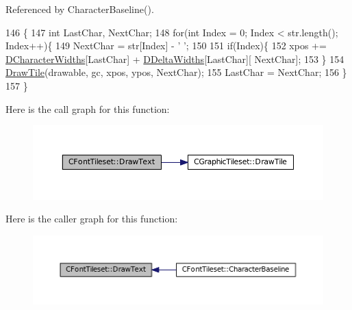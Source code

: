 Referenced by Character\+Baseline().


\begin{DoxyCode}
146                                                                                                        \{
147     \textcolor{keywordtype}{int} LastChar, NextChar;
148     \textcolor{keywordflow}{for}(\textcolor{keywordtype}{int} Index = 0; Index < str.length(); Index++)\{
149         NextChar = str[Index] - \textcolor{charliteral}{' '};
150         
151         \textcolor{keywordflow}{if}(Index)\{
152             xpos += \hyperlink{classCFontTileset_ad25347b5350a8380be8c550d9f2e2798}{DCharacterWidths}[LastChar] + \hyperlink{classCFontTileset_a1e253853e14282e9582a7f47dace8f70}{DDeltaWidths}[LastChar][
      NextChar]; 
153         \}
154         \hyperlink{classCGraphicTileset_afefd501a74e95295b7cd2dc868dcbbcb}{DrawTile}(drawable, gc, xpos, ypos, NextChar);
155         LastChar = NextChar;
156     \}
157 \}
\end{DoxyCode}
Here is the call graph for this function\+:\nopagebreak
\begin{figure}[H]
\begin{center}
\leavevmode
\includegraphics[width=350pt]{classCFontTileset_a4121603694e96e93378e079edd27086e_cgraph}
\end{center}
\end{figure}
Here is the caller graph for this function\+:\nopagebreak
\begin{figure}[H]
\begin{center}
\leavevmode
\includegraphics[width=350pt]{classCFontTileset_a4121603694e96e93378e079edd27086e_icgraph}
\end{center}
\end{figure}
\hypertarget{classCFontTileset_a987f13f64865891b7bf8b10f0b519fb7}{}\label{classCFontTileset_a987f13f64865891b7bf8b10f0b519fb7} 
